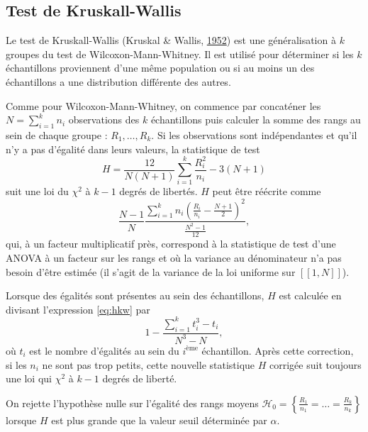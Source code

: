 \documentclass[12pt,a4paper]{reedthesis}
\theoremstyle{definition}
\theoremstyle{definition}
\theoremstyle{definition}
\theoremstyle{remark}
\begin{document}
\hypertarget{test-de-kruskall-wallis}{%
\subsection{Test de Kruskall-Wallis}\label{test-de-kruskall-wallis}}

Le test de Kruskall-Wallis (Kruskal \& Wallis, \protect\hyperlink{ref-kruskal1952use}{1952}) est une généralisation à \(k\) groupes du test de Wilcoxon-Mann-Whitney. Il est utilisé pour déterminer si les \(k\) échantillons proviennent d'une même population ou si au moins un des échantillons a une distribution différente des autres.

Comme pour Wilcoxon-Mann-Whitney, on commence par concaténer les \(N = \sum_{i = 1}^{k}n_i\) observations des \(k\) échantillons puis calculer la somme des rangs au sein de chaque groupe : \(R_1, \ldots, R_k\). Si les observations sont indépendantes et qu'il n'y a pas d'égalité dans leurs valeurs, la statistique de test
\begin{equation}
\label{eq:hkw}
H = \frac{12}{N (N + 1)} \sum_{i=1}^{k} \frac{R_i^2}{n_i} - 3(N + 1)
\end{equation}
suit une loi du \(\chi^2\) à \(k - 1\) degrés de libertés. \(H\) peut être réécrite comme
\begin{equation*}
\frac{N - 1}{N} \frac{ \sum_{i=1}^k n_i \left(\frac{R_i}{n_i} - \frac{N + 1}{2}\right)^2}{\frac{N^2-1}{12}},
\end{equation*}
qui, à un facteur multiplicatif près, correspond à la statistique de test d'une ANOVA à un facteur sur les rangs et où la variance au dénominateur n'a pas besoin d'être estimée (il s'agit de la variance de la loi uniforme sur \([\![1,N]\!]\)).

Lorsque des égalités sont présentes au sein des échantillons, \(H\) est calculée en divisant l'expression \eqref{eq:hkw} par
\begin{equation*}
1-\frac{\sum_{i = 1}^k t_i^3 - t_i}{N^3 - N},
\end{equation*}
où \(t_i\) est le nombre d'égalités au sein du \(i^{\text{ème}}\) échantillon. Après cette correction, si les \(n_i\) ne sont pas trop petits, cette nouvelle statistique \(H\) corrigée suit toujours une loi qui \(\chi^2\) à \(k - 1\) degrés de liberté.

On rejette l'hypothèse nulle sur l'égalité des rangs moyens \(\mathcal{H}_0 = \left\{ \frac{R_1}{n_1} = \ldots = \frac{R_k}{n_k} \right\}\) lorsque \(H\) est plus grande que la valeur seuil déterminée par \(\alpha\).
\end{document}
